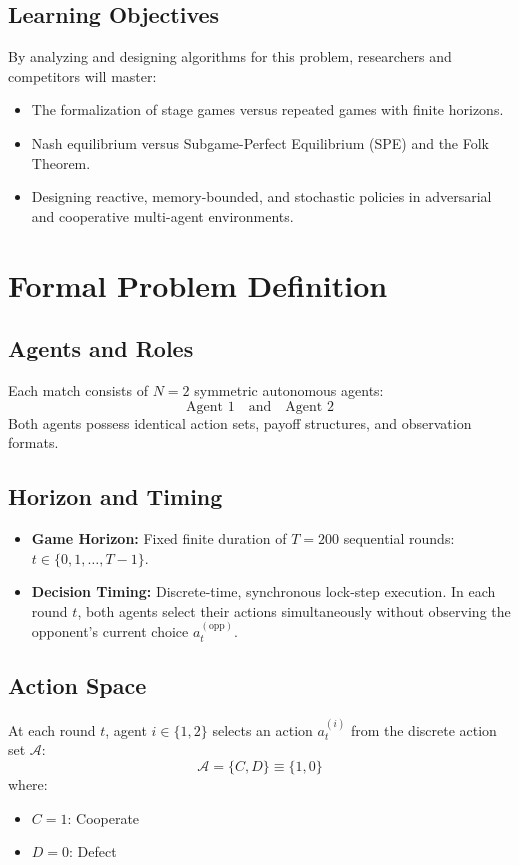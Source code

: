 ﻿\documentclass[11pt,a4paper]{article}
\begin{document}
\subsection{Learning Objectives}
By analyzing and designing algorithms for this problem, researchers and competitors will master:
\begin{itemize}
    \item The formalization of stage games versus repeated games with finite horizons.
    \item Nash equilibrium versus Subgame-Perfect Equilibrium (SPE) and the Folk Theorem.
    \item Designing reactive, memory-bounded, and stochastic policies in adversarial and cooperative multi-agent environments.
\end{itemize}


\section{Formal Problem Definition}

\subsection{Agents and Roles}
Each match consists of $N = 2$ symmetric autonomous agents:
\[
\text{Agent } 1 \quad \text{and} \quad \text{Agent } 2
\]
Both agents possess identical action sets, payoff structures, and observation formats.

\subsection{Horizon and Timing}
\begin{itemize}
    \item \textbf{Game Horizon:} Fixed finite duration of $T = 200$ sequential rounds: $t \in \{0, 1, \dots, T-1\}$.
    \item \textbf{Decision Timing:} Discrete-time, synchronous lock-step execution. In each round $t$, both agents select their actions simultaneously without observing the opponent's current choice $a_t^{(\text{opp})}$.
\end{itemize}

\subsection{Action Space}
At each round $t$, agent $i \in \{1, 2\}$ selects an action $a_t^{(i)}$ from the discrete action set $\mathcal{A}$:
\[
\mathcal{A} = \{C, D\} \equiv \{1, 0\}
\]
where:
\begin{itemize}
    \item $C = 1$: Cooperate
    \item $D = 0$: Defect
\end{itemize}
\end{document}
